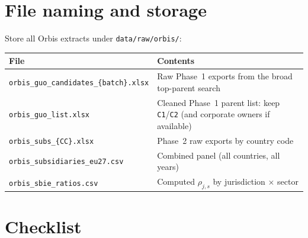 \documentclass[11pt,a4paper]{article}
\newcommand{\field}[1]{\texttt{#1}}
\begin{document}
\section{File naming and storage}\label{sec:storage}

Store all Orbis extracts under \texttt{data/raw/orbis/}:

\begin{center}
\begin{tabular}{@{}ll@{}}
\toprule
\textbf{File} & \textbf{Contents} \\
\midrule
\texttt{orbis\_guo\_candidates\_\{batch\}.xlsx} & Raw Phase~1 exports from the broad top-parent search \\
\texttt{orbis\_guo\_list.xlsx} & Cleaned Phase~1 parent list: keep \field{C1}/\field{C2} (and corporate owners if available) \\
\texttt{orbis\_subs\_\{CC\}.xlsx} & Phase~2 raw exports by country code \\
\texttt{orbis\_subsidiaries\_eu27.csv} & Combined panel (all countries, all years) \\
\texttt{orbis\_sbie\_ratios.csv} & Computed $\rho_{j,s}$ by jurisdiction $\times$ sector \\
\bottomrule
\end{tabular}
\end{center}


\section{Checklist}\label{sec:checklist}
\end{document}
